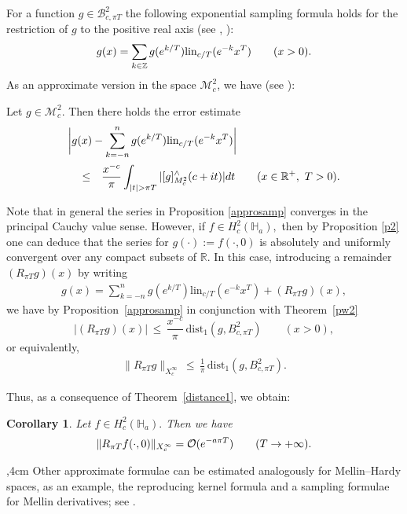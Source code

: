 \documentclass[amsmath,english,a4paper,graphicx,12pt]{article}
\begin{document}
For a function  $g \in \mathscr{B}^2_{c,\pi T}$ the following exponential sampling formula holds for the restriction of $g$ to the positive real axis 
(see \cite{BJ3}, \cite{BJ2}):
$$g(x) = \sum_{k \in \mathbb{Z}}g(e^{k/T})\mbox{\rm lin}_{c/T}(e^{-k}x^T) \qquad (x>0).$$
As an approximate version in the space $\mathcal{M}^2_c$, we have (see  \cite[Theorem~5.5]{BJ4}):
\begin{Proposition}\label{approsamp}
Let $g \in \mathcal{M}_c^2.$
Then there holds the error estimate
\begin{eqnarray*}
\lefteqn{\bigg|g(x) - \sum_{k=-n}^{n} g(e^{k/T})\mbox{\rm lin}_{c/T}(e^{-k}x^T)\bigg|} \quad\\
&\leq& \frac{x^{-c}}{\pi}\int_{|t| > \pi T}| [g]^\wedge_{M_c^2}(c+it)| dt \qquad(x \in \mathbb{R}^+,~T >0).
\end{eqnarray*}
\end{Proposition}
Note that in general the series in Proposition \ref{approsamp} converges in the principal Cauchy value sense. However, if 
$f \in H^2_c(\mathbb{H}_a),$ then by Proposition \ref{p2} one can deduce that the series for $g(\cdot) := f(\cdot, 0)$ is absolutely and uniformly convergent over any compact subsets of $\mathbb{R}.$ In this case, 
introducing a remainder $(R_{\pi T} g)(x)$ by writing
\begin{eqnarray*}
 g(x) = \sum_{k=-n}^n g\left(e^{k/T}\right) \mbox{lin}_{c/T}\left(e^{-k}x^T\right)
+ \left(R_{\pi T}g\right)(x),
\end{eqnarray*}
we have  by Proposition~\ref{approsamp} in conjunction with Theorem~\ref{pw2}
$$
|(R_{\pi T} g)(x)|\,\leq\, \frac{x^{-c}}{\pi}\,\mbox{dist}_1(g, B_{c,\pi
T}^2) \qquad (x>0),$$
or equivalently,
\begin{eqnarray*}
\|R_{\pi T} g\|_{X_c^\infty}\,\leq\, \frac{1}{\pi}\,\mbox{dist}_1(g, B_{c,\pi T}^2).
\end{eqnarray*}

Thus, as a consequence of Theorem~\ref{distance1}, we obtain:
\newtheorem{Corollary}{Corollary}
\begin{Corollary}
Let $f \in H^2_c(\mathbb{H}_a).$ Then we have
$$\|R_{\pi T} f(\cdot, 0)\|_{X_c^\infty} = {\cal O}(e^{-a\pi T}) \qquad (T \rightarrow +\infty).$$
\end{Corollary}
,4cm
Other approximate formulae can be estimated analogously for Mellin--Hardy spaces, as an example, the reproducing kernel formula and a sampling 
formulae for Mellin derivatives; see \cite{BBMS2}.
\end{document}
